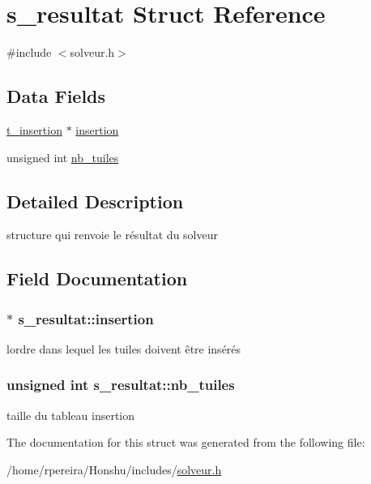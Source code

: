 \hypertarget{structs__resultat}{}\section{s\+\_\+resultat Struct Reference}
\label{structs__resultat}


{\ttfamily \#include $<$solveur.\+h$>$}

\subsection*{Data Fields}
\begin{DoxyCompactItemize}
\item 
\hyperlink{solveur_8h_a314021ae07491a975b3850efbcfd2d31}{t\+\_\+insertion} $\ast$ \hyperlink{structs__resultat_af48be4d6f59384a05a420fbdf0eedc4e}{insertion}
\item 
unsigned int \hyperlink{structs__resultat_afa26821484d62a4501f0a152a8e34db6}{nb\+\_\+tuiles}
\end{DoxyCompactItemize}


\subsection{Detailed Description}
structure qui renvoie le résultat du solveur 

\subsection{Field Documentation}
\subsubsection[{\texorpdfstring{insertion}{insertion}}]{$\ast$ s\+\_\+resultat\+::insertion}\hypertarget{structs__resultat_af48be4d6f59384a05a420fbdf0eedc4e}{}\label{structs__resultat_af48be4d6f59384a05a420fbdf0eedc4e}
l\textquotesingle{}ordre dans lequel les tuiles doivent être insérés 
\subsubsection[{\texorpdfstring{nb\+\_\+tuiles}{nb_tuiles}}]{\setlength{\rightskip}{0pt plus 5cm}unsigned int s\+\_\+resultat\+::nb\+\_\+tuiles}\hypertarget{structs__resultat_afa26821484d62a4501f0a152a8e34db6}{}\label{structs__resultat_afa26821484d62a4501f0a152a8e34db6}
taille du tableau \textquotesingle{}insertion\textquotesingle{} 

The documentation for this struct was generated from the following file\+:\begin{DoxyCompactItemize}
\item 
/home/rpereira/\+Honshu/includes/\hyperlink{solveur_8h}{solveur.\+h}\end{DoxyCompactItemize}
